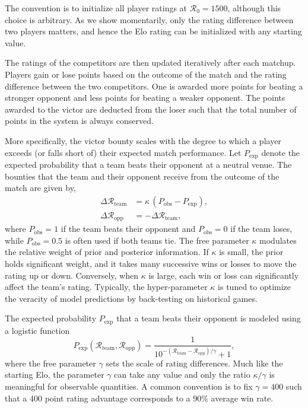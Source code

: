 \documentclass[aps,prc,reprint,amsmath,superscriptaddress]{revtex4-1}
\newcommand{\R}{\mathcal{R}}
\begin{document}
The convention is to initialize all player ratings at ${\R_0 = 1500}$, although this choice is arbitrary.
As we show momentarily, only the rating difference between two players matters, and hence the Elo rating can be initialized with any starting value.

The ratings of the competitors are then updated iteratively after each matchup.
Players gain or lose points based on the outcome of the match and the rating difference between the two competitors.
One is awarded more points for beating a stronger opponent and less points for beating a weaker opponent.
The points awarded to the victor are deducted from the loser such that the total number of points in the system is always conserved.

More specifically, the victor bounty scales with the degree to which a player exceeds (or falls short of) their expected match performance.
Let $P_\text{exp}$ denote the expected probability that a team beats their opponent at a neutral venue.
The bounties that the team and their opponent receive from the outcome of the match are given by,
\begin{align}
  \label{elo}
  \Delta \R_\text{team} &= \kappa \,(P_\text{obs} - P_\text{exp}),\\
  \Delta \R_\text{opp} &= -\Delta \R_\text{team},
\end{align}
where ${P_\text{obs}=1}$ if the team beats their opponent and ${P_\text{obs}=0}$ if the team loses, while $P_\text{obs}=0.5$ is often used if both teams tie.
The free parameter $\kappa$ modulates the relative weight of prior and posterior information. 
If $\kappa$ is small, the prior holds significant weight, and it takes many successive wins or losses to move the rating up or down.
Conversely, when $\kappa$ is large, each win or loss can significantly affect the team's rating.
Typically, the hyper-parameter $\kappa$ is tuned to optimize the veracity of model predictions by back-testing on historical games.

The expected probability $P_\text{exp}$ that a team beats their opponent is modeled using a logistic function
\begin{equation}
  \label{win_prob}
  P_\text{exp}(\R_\text{team}, \R_\text{opp}) = \frac{1}{10^{-(\R_\text{team} - \R_\text{opp})/\gamma} +1},
\end{equation}
where the free parameter $\gamma$ sets the scale of rating differences.
Much like the starting Elo, the parameter $\gamma$ can take any value and only the ratio $\kappa/\gamma$ is meaningful for observable quantities.
A common convention is to fix $\gamma=400$ such that a 400 point rating advantage corresponds to a 90\% average win rate.
\end{document}
